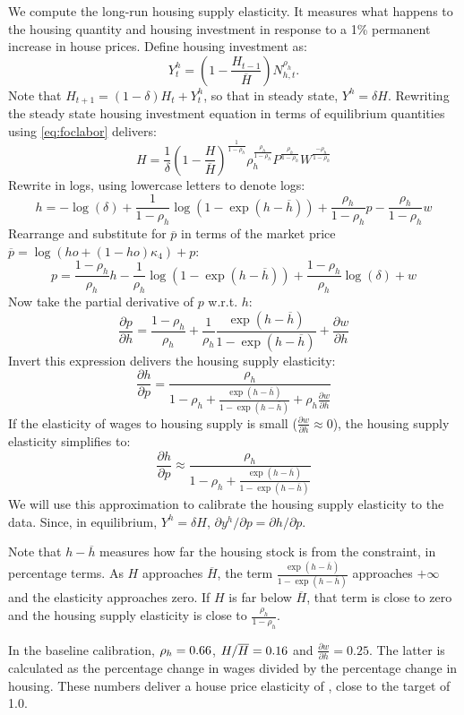\documentclass[letterpaper,12pt,dvipsnames,usenames]{article}
\theoremstyle{definition}
\begin{document}
\begin{spacing}{1.0}
\begin{small}
We compute the long-run housing supply elasticity. It measures what happens to the housing quantity and housing investment in response to a 1\% permanent increase in house prices. Define housing investment as:
\[Y_t^h = \left(1-\frac{H_{t-1}}{\overline{H}}\right) N_{h,t}^{\rho_h}.\]
Note that $H_{t+1}=(1-\delta) H_t+Y_t^h$, so that in steady state, $Y^h=\delta H$. Rewriting the steady state housing investment equation in terms of equilibrium quantities using \eqref{eq:foclabor} delivers:
\[ H = \frac{1}{\delta} \left(1-\frac{H}{\overline{H}}\right)^\frac{1}{1-\rho_h}  \rho_h^{\frac{\rho_h}{1-\rho_h}}  {P}^{\frac{\rho_h}{1-\rho_h}} W^{\frac{-\rho_h}{1-\rho_h}}\]
Rewrite in logs, using lowercase letters to denote logs:
\[h = -\log(\delta) + \frac{1}{1-\rho_h} \log(1-\exp(h-\overline{h})) + \frac{\rho_h}{1-\rho_h} {p} - \frac{\rho_h}{1-\rho_h} w\]
Rearrange and substitute for $\overline p$ in terms of the market price $\overline p=\log(ho+(1-ho)\kappa_4)+p$:
\[p=  \frac{1-\rho_h}{\rho_h} h - \frac{1}{\rho_h} \log(1-\exp(h-\overline{h})) +  \frac{1-\rho_h}{\rho_h} \log(\delta) + w\]
Now take the partial derivative of $p$ w.r.t. $h$:
\[\frac{\partial p}{ \partial h} = \frac{1-\rho_h}{\rho_h} + \frac{1}{\rho_h} \frac{\exp(h-\overline{h})}{1-\exp(h-\overline{h})} + \frac{\partial w}{\partial h}\]
Invert this expression delivers the housing supply elasticity:
\[\frac{\partial h}{ \partial p} = \frac{\rho_h}{1-\rho_h + \frac{\exp(h-\overline{h})}{1-\exp(h-\overline{h})} + \rho_h \frac{\partial w}{\partial h}} \]
If the elasticity of wages to housing supply is small ($\frac{\partial w}{\partial h}\approx 0$), the housing supply elasticity simplifies to:
\[\frac{\partial h}{ \partial p} \approx \frac{\rho_h}{1-\rho_h + \frac{\exp(h-\overline{h})}{1-\exp(h-\overline{h})} } \]
We will use this approximation to calibrate the housing supply elasticity to the data. Since, in equilibrium, $Y^h=\delta H$, $\partial y^h/\partial p=\partial h/\partial p$.


Note that $h-\overline{h}$ measures how far the housing stock is from the constraint, in percentage terms. As $H$ approaches $\overline{H}$, the term $\frac{\exp(h-\overline{h})}{1-\exp(h-\overline{h})}$ approaches $+ \infty$ and the elasticity approaches zero.  If $H$ is far below $\overline{H}$, that term is close to zero and the housing supply elasticity is close to $\frac{\rho_h}{1-\rho_h}$.

In the baseline calibration, $\rho_h={0.66}$, $H/\overline{H}= {0.16}$ and $\frac{\partial w}{\partial h}=0.25$. The latter is calculated as the percentage change in wages divided by the percentage change in housing. These numbers deliver a house price elasticity of {\HSE}, close to the target of 1.0.


\end{small}
\end{spacing}
\end{document}
